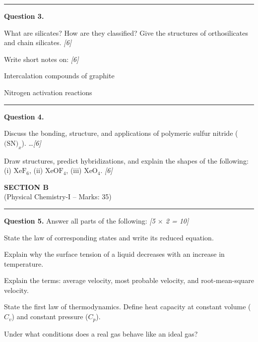 \documentclass[11pt,a4paper]{article}
\newcommand{\pts}[1]{\hfill   \textit{[#1]}}
\begin{document}
\medskip\rule{\linewidth}{0.2pt}




\noindent   \textbf{Question 3.}

\begin{parts}
  \item What are silicates? How are they classified? Give the structures of orthosilicates and chain silicates. \pts{6}
  \item Write short notes on: \pts{6}
  
\begin{parts}
    \item Intercalation compounds of graphite
    \item Nitrogen activation reactions
  \end{parts}
\end{parts}

\medskip\rule{\linewidth}{0.2pt}




\noindent   \textbf{Question 4.}

\begin{parts}
  \item Discuss the bonding, structure, and applications of polymeric sulfur nitride ($ \text{(SN)}_x$). \dots \pts{6}
  \item Draw structures, predict hybridizations, and explain the shapes of the following: (i) $ \text{XeF}_6$, (ii) $ \text{XeOF}_4$, (iii) $ \text{XeO}_4$. \pts{6}
\end{parts}


\newpage

\begin{center}
  {\large\bfseries SECTION B}\\[2pt]
  {\normalsize (Physical Chemistry-I -- Marks: 35)}
\end{center}
\rule{0.4\linewidth}{0.2pt}
\smallskip




\noindent   \textbf{Question 5.} Answer all parts of the following: \pts{5 $ \times$ 2 = 10}

\begin{parts}
  \item State the law of corresponding states and write its reduced equation.
  \item Explain why the surface tension of a liquid decreases with an increase in temperature.
  \item Explain the terms: average velocity, most probable velocity, and root-mean-square velocity.
  \item State the first law of thermodynamics. Define heat capacity at constant volume ($C_v$) and constant pressure ($C_p$).
  \item Under what conditions does a real gas behave like an ideal gas?
\end{parts}
\end{document}
